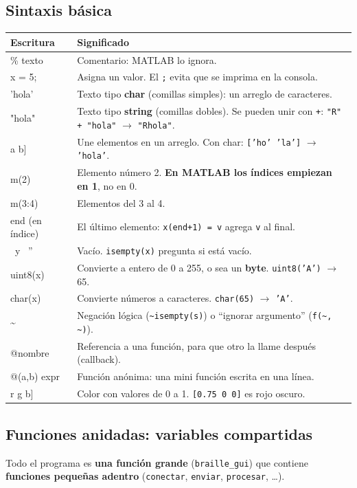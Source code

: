 \documentclass[11pt,a4paper]{article}
\newcommand{\cod}[1]{\texttt{#1}}
\begin{document}
\subsection{Sintaxis básica}
\begin{longtable}{>{\ttfamily}p{3.6cm} p{10.6cm}}
\toprule
\normalfont\textbf{Escritura} & \textbf{Significado} \\
\midrule
\endhead
\% texto & Comentario: MATLAB lo ignora. \\
x = 5; & Asigna un valor. El \cod{;} evita que se imprima en la consola. \\
'hola' & Texto tipo \textbf{char} (comillas simples): un arreglo de caracteres. \\
"hola" & Texto tipo \textbf{string} (comillas dobles). Se pueden unir con \cod{+}: \cod{"R" + "hola"} $\rightarrow$ \cod{"Rhola"}. \\
{[}a b{]} & Une elementos en un arreglo. Con char: \cod{['ho' 'la']} $\rightarrow$ \cod{'hola'}. \\
m(2) & Elemento número 2. \textbf{En MATLAB los índices empiezan en 1}, no en 0. \\
m(3:4) & Elementos del 3 al 4. \\
end (en índice) & El último elemento: \cod{x(end+1) = v} agrega \cod{v} al final. \\
{[}{]} \ y \ '' & Vacío. \cod{isempty(x)} pregunta si está vacío. \\
uint8(x) & Convierte a entero de 0 a 255, o sea un \textbf{byte}. \cod{uint8('A')} $\rightarrow$ 65. \\
char(x) & Convierte números a caracteres. \cod{char(65)} $\rightarrow$ \cod{'A'}. \\
\textasciitilde & Negación lógica (\cod{\textasciitilde isempty(s)}) o ``ignorar argumento'' (\cod{f(\textasciitilde, \textasciitilde)}). \\
@nombre & Referencia a una función, para que otro la llame después (callback). \\
@(a,b) expr & Función anónima: una mini función escrita en una línea. \\
{[}r g b{]} & Color con valores de 0 a 1. \cod{[0.75 0 0]} es rojo oscuro. \\
\bottomrule
\end{longtable}

\subsection{Funciones anidadas: variables compartidas}
Todo el programa es \textbf{una función grande} (\cod{braille\_gui}) que contiene
\textbf{funciones pequeñas adentro} (\cod{conectar}, \cod{enviar}, \cod{procesar}, \ldots).
\end{document}
